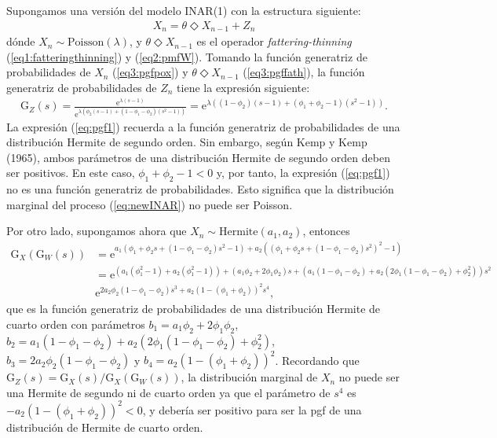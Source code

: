 \documentclass[12pt,twoside]{article} %
\begin{document}
Supongamos una versión del modelo INAR(1) con la estructura siguiente: 
\begin{align}\label{eq:newINAR}
X_n=\theta \Diamond X_{n-1}+Z_n
\end{align}
dónde $X_n \sim \textrm{Poisson}(\lambda)$, y $\theta \Diamond X_{n-1}$ es el operador \textit{fattering-thinning} (\ref{eq1:fatteringthinning}) y (\ref{eq2:pmfW}). Tomando la función generatriz de probabilidades de $X_n$ (\ref{eq3:pgfpox}) y $\theta \Diamond X_{n-1}$ (\ref{eq3:pgffath}), la función generatriz de probabilidades de $Z_n$ tiene la expresión siguiente:
\begin{align}\label{eq:pgf1}
\textrm{G}_Z(s)=\frac{\textrm{e}^{\lambda(s-1)}}{\textrm{e}^{\lambda\left(\phi_2(s-1)+(1-\phi_1-\phi_2)(s^2-1)\right)}}=\textrm{e}^{\lambda\left((1-\phi_2)(s-1)+(\phi_1+\phi_2-1)(s^2-1)\right)}.
\end{align}
La expresión (\ref{eq:pgf1}) recuerda a la función generatriz de probabilidades de una distribución Hermite de segundo orden. Sin embargo, según Kemp y Kemp (1965), ambos parámetros de una distribución Hermite de segundo orden deben ser positivos. En este caso, $\phi_1+\phi_2-1<0$ y, por tanto, la expresión (\ref{eq:pgf1}) no es una función generatriz de probabilidades. Esto significa que la distribución marginal del proceso (\ref{eq:newINAR}) no puede ser Poisson. 

\medskip

\noindent Por otro lado, supongamos ahora que $X_n \sim \textrm{Hermite}(a_1,a_2)$, entonces 
\begin{align*}
\textrm{G}_X(\textrm{G}_W(s))&=\textrm{e}^{a_1\left(\phi_1+\phi_2s+(1-\phi_1-\phi_2)s^2-1\right)+a_2\left(\left(\phi_1+\phi_2s+(1-\phi_1-\phi_2)s^2\right)^2-1\right)}\\&=\textrm{e}^{\left(a_1(\phi_1^2-1)+a_2(\phi_1^2-1)\right)+\left(a_1\phi_2+2\phi_1\phi_2\right)s+\left(a_1(1-\phi_1-\phi_2)+a_2(2\phi_1(1-\phi_1-\phi_2)+\phi_2^2)\right)s^2}\\ &\textrm{e}^{2a_2\phi_2(1-\phi_1-\phi_2)s^3+a_2(1-(\phi_1+\phi_2))^2s^4},
\end{align*}
que es la función generatriz de probabilidades de una distribución Hermite de cuarto orden con parámetros $b_1=a_1\phi_2+2\phi_1\phi_2$, $b_2=a_1(1-\phi_1-\phi_2)+a_2(2\phi_1(1-\phi_1-\phi_2)+\phi_2^2)$, $b_3=2a_2\phi_2(1-\phi_1-\phi_2)$ y $b_4=a_2(1-(\phi_1+\phi_2))^2$. Recordando que $\textrm{G}_Z(s)=\textrm{G}_X(s)/\textrm{G}_X(\textrm{G}_W(s))$, la distribución marginal de $X_n$ no puede ser una Hermite de segundo ni de cuarto orden ya que el parámetro de $s^4$ es $-a_2(1-(\phi_1+\phi_2))^2<0$, y debería ser positivo para ser la pgf de una distribución de Hermite de cuarto orden.
\end{document}
